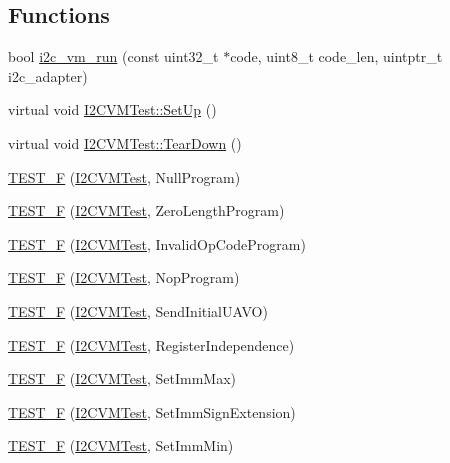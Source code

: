 \subsection*{\-Functions}
\begin{DoxyCompactItemize}
\item 
bool \hyperlink{group___unit_tests_ga25fa33f408947a8b6015181705441220}{i2c\-\_\-vm\-\_\-run} (const uint32\-\_\-t $\ast$code, uint8\-\_\-t code\-\_\-len, uintptr\-\_\-t i2c\-\_\-adapter)
\item 
virtual void \hyperlink{group___unit_tests_ga14dcb45d7859a9c686f96f3ca84013c4}{\-I2\-C\-V\-M\-Test\-::\-Set\-Up} ()
\item 
virtual void \hyperlink{group___unit_tests_ga7c761569820d4a0ce44dc316e20870e7}{\-I2\-C\-V\-M\-Test\-::\-Tear\-Down} ()
\item 
\hyperlink{group___unit_tests_ga10c5fdc24984add2787d6dd8b945dec4}{\-T\-E\-S\-T\-\_\-\-F} (\hyperlink{class_i2_c_v_m_test}{\-I2\-C\-V\-M\-Test}, \-Null\-Program)
\item 
\hyperlink{group___unit_tests_ga0e38611807a8fda65d9205b4210b4eb6}{\-T\-E\-S\-T\-\_\-\-F} (\hyperlink{class_i2_c_v_m_test}{\-I2\-C\-V\-M\-Test}, \-Zero\-Length\-Program)
\item 
\hyperlink{group___unit_tests_gad02391e83795156c832c539efb040a39}{\-T\-E\-S\-T\-\_\-\-F} (\hyperlink{class_i2_c_v_m_test}{\-I2\-C\-V\-M\-Test}, \-Invalid\-Op\-Code\-Program)
\item 
\hyperlink{group___unit_tests_ga910c1f79944cb7a8b4dcbb6aad106cd0}{\-T\-E\-S\-T\-\_\-\-F} (\hyperlink{class_i2_c_v_m_test}{\-I2\-C\-V\-M\-Test}, \-Nop\-Program)
\item 
\hyperlink{group___unit_tests_ga368e9e15e13bc83e0a503fb312b095f9}{\-T\-E\-S\-T\-\_\-\-F} (\hyperlink{class_i2_c_v_m_test}{\-I2\-C\-V\-M\-Test}, \-Send\-Initial\-U\-A\-V\-O)
\item 
\hyperlink{group___unit_tests_gae71b9ce7ab11f166b843e3658a8ff438}{\-T\-E\-S\-T\-\_\-\-F} (\hyperlink{class_i2_c_v_m_test}{\-I2\-C\-V\-M\-Test}, \-Register\-Independence)
\item 
\hyperlink{group___unit_tests_ga0a655cc31302bf8e9372a3c5ba7540e0}{\-T\-E\-S\-T\-\_\-\-F} (\hyperlink{class_i2_c_v_m_test}{\-I2\-C\-V\-M\-Test}, \-Set\-Imm\-Max)
\item 
\hyperlink{group___unit_tests_gab26ddcb061179d0238954b4a4f149b3b}{\-T\-E\-S\-T\-\_\-\-F} (\hyperlink{class_i2_c_v_m_test}{\-I2\-C\-V\-M\-Test}, \-Set\-Imm\-Sign\-Extension)
\item 
\hyperlink{group___unit_tests_ga9d1fd34d9c33dcae7684a163688efa51}{\-T\-E\-S\-T\-\_\-\-F} (\hyperlink{class_i2_c_v_m_test}{\-I2\-C\-V\-M\-Test}, \-Set\-Imm\-Min)

\end{DoxyCompactItemize}
